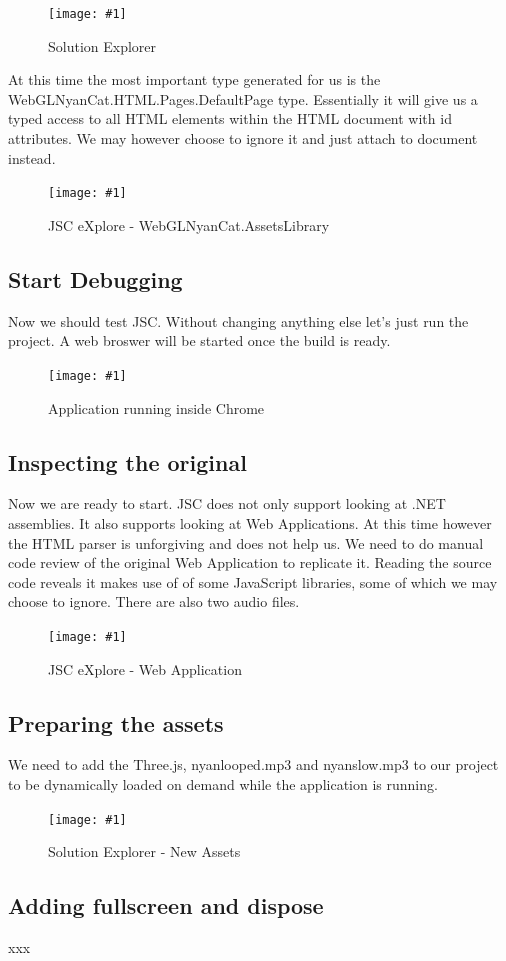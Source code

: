 \documentclass[12pt,leqno]{book}
\newcommand{\png}[1]{\texttt{[image: \#1]}}
\newcommand{\figpng}[2]{\begin{figure}[htb]\centering\png{#1}\caption{#2}\end{figure}}
\begin{document}
\figpng{Images/WebGLNyanCat_-_Microsoft_Visual_Web_Developer_2010_Express-2012-03-31_12.37.24}
{Solution Explorer}

At this time the most important type generated for us is the WebGLNyanCat.HTML.Pages.DefaultPage type. Essentially it will give us a typed access to all HTML elements within the HTML document with id attributes. We may however choose to ignore it and just attach to document instead.

\figpng{Images/eXplore-2012-03-31_12.41.39}
{JSC eXplore - WebGLNyanCat.AssetsLibrary}


\subsection{Start Debugging}
Now we should test JSC. Without changing anything else let's just run the project. A web broswer will be started once the build is ready.



\figpng{Images/A_string_from_JavaScript._-_Google_Chrome-2012-03-31_13.00.11}
{Application running inside Chrome}


\subsection{Inspecting the original}
Now we are ready to start. JSC does not only support looking at .NET assemblies. It also supports looking at Web Applications. At this time however the HTML parser is unforgiving and does not help us. We need to do manual code review of the original Web Application to replicate it. Reading the source code reveals it makes use of of some JavaScript libraries, some of which we may choose to ignore. There are also two audio files. 

\figpng{Images/eXplore-2012-03-31_13.12.27}
{JSC eXplore - Web Application}


\subsection{Preparing the assets}
We need to add the Three.js, nyanlooped.mp3 and nyanslow.mp3 to our project to be dynamically loaded on demand while the application is running.

\figpng{Images/WebGLNyanCat_-_Microsoft_Visual_Web_Developer_2010_Express-2012-03-31_13.24.27}
{Solution Explorer - New Assets}





\subsection{Adding fullscreen and dispose}
xxx
\end{document}
